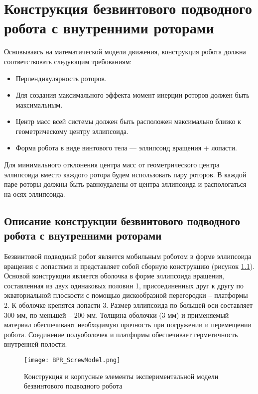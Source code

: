\chapter{Конструкция безвинтового подводного робота с внутренними роторами}\label{ch:ch3}

Основываясь на математической модели движения, конструкция робота должна соответствовать следующим требованиям:

\begin{itemize}
	\item Перпендикулярность роторов.
	\item Для создания максимального эффекта момент инерции роторов должен быть максимальным.
	\item Центр масс всей системы должен быть расположен максимально близко к геометрическому центру эллипсоида.
	\item Форма робота в виде винтового тела --- эллипсоид вращения + лопасти.
\end{itemize}

Для минимального отклонения центра масс от геометрического центра эллипсоида вместо каждого ротора будем использовать пару роторов. В каждой паре роторы должны быть равноудалены от центра эллипсоида и распологаться на осях эллипсоида.

\section{Описание конструкции безвинтового подводного робота с внутренними роторами}

Безвинтовой подводный робот является мобильным роботом в форме эллипсоида вращения с лопастями и представляет собой сборную конструкцию (рисунок \ref{constr_BPR}). Основой конструкции является оболочка в форме эллипсоида вращения, составленная из двух одинаковых половин 1, присоединенных друг к другу по экваториальной плоскости с помощью дискообразной перегородки – платформы 2. К оболочке крепятся лопасти 3. Размер эллипсоида по большей оси составляет 300 мм, по меньшей – 200 мм. Толщина оболочки (3 мм) и применяемый материал обеспечивают необходимую прочность при погружении и перемещении робота. Соединение полуоболочек и платформы обеспечивает герметичность внутренней полости.

\begin{figure}[h]
	\centering
	\texttt{[image: BPR\_ScrewModel.png]}%
	\caption{Конструкция и корпусные элементы экспериментальной модели безвинтового подводного робота}
	\label{constr_BPR}
\end{figure}

